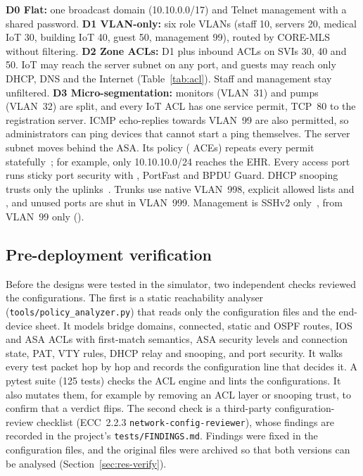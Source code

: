 \textbf{D0 Flat:} one broadcast domain (10.10.0.0/17) and Telnet management with a shared password.
\textbf{D1 VLAN-only:} six role VLANs (staff 10, servers 20, medical IoT 30, building IoT 40, guest 50, management 99), routed by CORE-MLS without filtering.
\textbf{D2 Zone ACLs:} D1 plus inbound ACLs on SVIs 30, 40 and 50. IoT may reach the server subnet on any port, and guests may reach only DHCP, DNS and the Internet (Table~\ref{tab:acl}). Staff and management stay unfiltered.
\textbf{D3 Micro-segmentation:} monitors (VLAN~31) and pumps (VLAN~32) are split, and every IoT ACL has one service permit, TCP~80 to the registration server. ICMP echo-replies towards VLAN~99 are also permitted, so administrators can ping devices that cannot start a ping themselves. The server subnet moves behind the ASA. Its  policy (\aceAsaDthree{} ACEs) repeats every permit statefully~\cite{ciscoasa922}; for example, only 10.10.10.0/24 reaches the EHR. Every access port runs sticky port security with , PortFast and BPDU Guard. DHCP snooping trusts only the uplinks~\cite{rfc3046}. Trunks use native VLAN~998, explicit allowed lists and , and unused ports are shut in VLAN~999. Management is SSHv2 only~\cite{rfc4253}, from VLAN~99 only ().



\subsection{Pre-deployment verification}
\label{sec:verify}
Before the designs were tested in the simulator, two independent checks reviewed the configurations. The first is a static reachability analyser (\texttt{tools/policy\_analyzer.py}) that reads only the configuration files and the end-device sheet. It models bridge domains, connected, static and OSPF routes, IOS and ASA ACLs with first-match semantics, ASA security levels and connection state, PAT, VTY rules, DHCP relay and snooping, and port security. It walks every test packet hop by hop and records the configuration line that decides it. A pytest suite (125 tests) checks the ACL engine and lints the configurations. It also mutates them, for example by removing an ACL layer or snooping trust, to confirm that a verdict flips. The second check is a third-party configuration-review checklist (ECC~2.2.3 \texttt{network-config-reviewer}), whose findings are recorded in the project's \texttt{tests/FINDINGS.md}. Findings were fixed in the configuration files, and the original files were archived so that both versions can be analysed (Section~\ref{sec:res-verify}).

